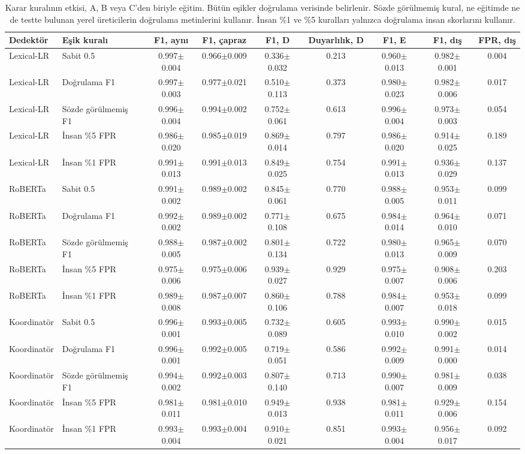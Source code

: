 \begin{table}[t]
\centering
\footnotesize
\caption{Karar kuralının etkisi, A, B veya C'den biriyle eğitim. Bütün eşikler doğrulama verisinde belirlenir. Sözde görülmemiş kural, ne eğitimde ne de testte bulunan yerel üreticilerin doğrulama metinlerini kullanır. İnsan \%1 ve \%5 kuralları yalnızca doğrulama insan skorlarını kullanır.}
\label{tab:thresholds}
\begin{tabular}{llccccccc}
\toprule
Dedektör & Eşik kuralı & F1, aynı & F1, çapraz & F1, D & Duyarlılık, D & F1, E & F1, dış & FPR, dış \\
\midrule
Lexical-LR & Sabit 0.5 & 0.997$\pm$0.004 & 0.966$\pm$0.009 & 0.336$\pm$0.032 & 0.213 & 0.960$\pm$0.013 & 0.982$\pm$0.001 & 0.004 \\
Lexical-LR & Doğrulama F1 & 0.997$\pm$0.003 & 0.977$\pm$0.021 & 0.510$\pm$0.113 & 0.373 & 0.980$\pm$0.023 & 0.982$\pm$0.006 & 0.017 \\
Lexical-LR & Sözde görülmemiş F1 & 0.996$\pm$0.004 & 0.994$\pm$0.002 & 0.752$\pm$0.061 & 0.613 & 0.996$\pm$0.004 & 0.973$\pm$0.003 & 0.054 \\
Lexical-LR & İnsan \%5 FPR & 0.986$\pm$0.020 & 0.985$\pm$0.019 & 0.869$\pm$0.014 & 0.797 & 0.986$\pm$0.020 & 0.914$\pm$0.025 & 0.189 \\
Lexical-LR & İnsan \%1 FPR & 0.991$\pm$0.013 & 0.991$\pm$0.013 & 0.849$\pm$0.025 & 0.754 & 0.991$\pm$0.013 & 0.936$\pm$0.029 & 0.137 \\
RoBERTa & Sabit 0.5 & 0.991$\pm$0.002 & 0.989$\pm$0.002 & 0.845$\pm$0.061 & 0.770 & 0.988$\pm$0.005 & 0.953$\pm$0.011 & 0.099 \\
RoBERTa & Doğrulama F1 & 0.992$\pm$0.002 & 0.989$\pm$0.002 & 0.771$\pm$0.108 & 0.675 & 0.984$\pm$0.014 & 0.964$\pm$0.010 & 0.071 \\
RoBERTa & Sözde görülmemiş F1 & 0.988$\pm$0.005 & 0.987$\pm$0.002 & 0.801$\pm$0.134 & 0.722 & 0.980$\pm$0.013 & 0.965$\pm$0.009 & 0.070 \\
RoBERTa & İnsan \%5 FPR & 0.975$\pm$0.006 & 0.975$\pm$0.006 & 0.939$\pm$0.027 & 0.929 & 0.975$\pm$0.007 & 0.908$\pm$0.006 & 0.203 \\
RoBERTa & İnsan \%1 FPR & 0.989$\pm$0.008 & 0.987$\pm$0.007 & 0.860$\pm$0.106 & 0.788 & 0.984$\pm$0.007 & 0.953$\pm$0.018 & 0.099 \\
Koordinatör & Sabit 0.5 & 0.996$\pm$0.001 & 0.993$\pm$0.005 & 0.732$\pm$0.089 & 0.605 & 0.993$\pm$0.010 & 0.990$\pm$0.002 & 0.015 \\
Koordinatör & Doğrulama F1 & 0.996$\pm$0.001 & 0.992$\pm$0.005 & 0.719$\pm$0.051 & 0.586 & 0.992$\pm$0.009 & 0.991$\pm$0.000 & 0.014 \\
Koordinatör & Sözde görülmemiş F1 & 0.994$\pm$0.002 & 0.992$\pm$0.003 & 0.807$\pm$0.140 & 0.713 & 0.990$\pm$0.007 & 0.981$\pm$0.009 & 0.038 \\
Koordinatör & İnsan \%5 FPR & 0.981$\pm$0.011 & 0.981$\pm$0.010 & 0.949$\pm$0.013 & 0.938 & 0.981$\pm$0.011 & 0.929$\pm$0.006 & 0.154 \\
Koordinatör & İnsan \%1 FPR & 0.993$\pm$0.004 & 0.993$\pm$0.004 & 0.910$\pm$0.021 & 0.851 & 0.993$\pm$0.004 & 0.956$\pm$0.017 & 0.092 \\
\bottomrule
\end{tabular}
\end{table}
